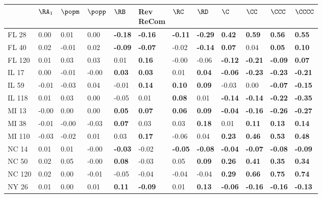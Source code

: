 \begin{tabular}{llllllllllll}
\toprule
 & $\RA_1$ & $\popm$ & $\popp$ & $\RB$ & \makecell{Rev \\ ReCom} & $\RC$ & $\RD$ & $\C$ & $\CC$ & $\CCC$ & $\CCCC$ \\
\midrule
FL 28 & 0.00 & 0.01 & 0.00 & \textbf{-0.18} & \textbf{-0.16} & \textbf{-0.11} & \textbf{-0.29} & \textbf{0.42} & \textbf{0.59} & \textbf{0.56} & \textbf{0.55} \\
FL 40 & 0.02 & -0.01 & 0.02 & \textbf{-0.09} & \textbf{-0.07} & -0.02 & \textbf{-0.14} & \textbf{0.07} & 0.04 & \textbf{0.05} & \textbf{0.10} \\
FL 120 & 0.01 & 0.03 & 0.03 & 0.01 & \textbf{0.16} & -0.00 & -0.06 & \textbf{-0.12} & \textbf{-0.21} & \textbf{-0.09} & \textbf{0.07} \\
IL 17 & 0.00 & -0.01 & -0.00 & \textbf{0.03} & \textbf{0.03} & 0.01 & \textbf{0.04} & \textbf{-0.06} & \textbf{-0.23} & \textbf{-0.23} & \textbf{-0.21} \\
IL 59 & -0.01 & -0.03 & 0.04 & -0.01 & \textbf{0.14} & \textbf{0.10} & \textbf{0.09} & -0.03 & 0.00 & \textbf{-0.07} & \textbf{-0.15} \\
IL 118 & 0.01 & 0.03 & 0.00 & -0.05 & 0.01 & \textbf{0.08} & 0.01 & \textbf{-0.14} & \textbf{-0.14} & \textbf{-0.22} & \textbf{-0.35} \\
MI 13 & -0.00 & 0.00 & 0.00 & \textbf{0.05} & \textbf{0.07} & \textbf{0.06} & \textbf{0.09} & \textbf{-0.04} & \textbf{-0.16} & \textbf{-0.26} & \textbf{-0.27} \\
MI 38 & -0.01 & -0.00 & -0.03 & \textbf{0.07} & 0.03 & 0.03 & \textbf{0.18} & 0.01 & \textbf{0.11} & \textbf{0.13} & \textbf{0.14} \\
MI 110 & -0.03 & -0.02 & 0.01 & 0.03 & \textbf{0.17} & -0.06 & 0.04 & \textbf{0.23} & \textbf{0.46} & \textbf{0.53} & \textbf{0.48} \\
NC 14 & 0.01 & 0.01 & -0.00 & \textbf{-0.03} & -0.02 & \textbf{-0.05} & \textbf{-0.08} & \textbf{-0.04} & \textbf{-0.07} & \textbf{-0.08} & \textbf{-0.09} \\
NC 50 & 0.02 & 0.05 & -0.00 & \textbf{0.08} & -0.03 & 0.05 & \textbf{0.09} & \textbf{0.26} & \textbf{0.41} & \textbf{0.35} & \textbf{0.34} \\
NC 120 & 0.02 & 0.00 & -0.01 & -0.05 & -0.04 & -0.04 & -0.04 & \textbf{0.29} & \textbf{0.66} & \textbf{0.75} & \textbf{0.74} \\
NY 26 & 0.01 & 0.00 & 0.01 & \textbf{0.11} & \textbf{-0.09} & 0.01 & \textbf{0.13} & \textbf{-0.06} & \textbf{-0.16} & \textbf{-0.16} & \textbf{-0.13} \\

\end{tabular}
